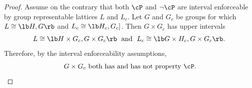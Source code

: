 \begin{frame}[label=IEPropsLemmaProof]{}
\begin{proof}
Assume on the contrary that both $\cP$ and $\neg \cP$
are interval enforceable by group representable lattices $L$ and $L_c$. 
\vskip2mm
Let $G$ and $G_c$ be groups for which $L\cong \lb H,G \rb$ and $L_c\cong
\lb H_c,G_c]$.
\vskip2mm
Then $G\times G_c$ has upper intervals 
\[L\cong \lb H\times G_c, G\times G_c \rb\; \text{ and }\;
L_c\cong \lb G\times H_c, G\times G_c \rb.\]  
Therefore, by the interval enforceability
assumptions, 
\[
\text{ $G\times G_c$ both has and has not property $\cP$.}
\] 
\end{proof}
\end{frame}









